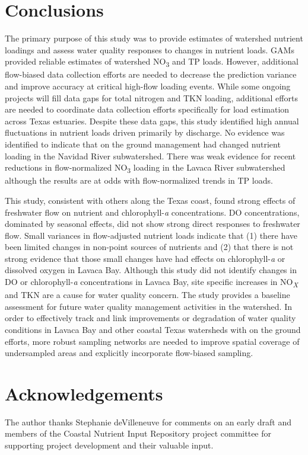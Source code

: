 \documentclass[fleqn,10pt,lineno]{wlpeerj} %
\begin{document}
\hypertarget{conclusions}{%
\section*{Conclusions}\label{conclusions}}

The primary purpose of this study was to provide estimates of watershed
nutrient loadings and assess water quality responses to changes in
nutrient loads. GAMs provided reliable estimates of watershed
NO\textsubscript{3} and TP loads. However, additional flow-biased data
collection efforts are needed to decrease the prediction variance and
improve accuracy at critical high-flow loading events. While some
ongoing projects will fill data gaps for total nitrogen and TKN loading,
additional efforts are needed to coordinate data collection efforts
specifically for load estimation across Texas estuaries. Despite these
data gaps, this study identified high annual fluctuations in nutrient
loads driven primarily by discharge. No evidence was identified to
indicate that on the ground management had changed nutrient loading in
the Navidad River subwatershed. There was weak evidence for recent
reductions in flow-normalized NO\textsubscript{3} loading in the Lavaca
River subwatershed although the results are at odds with flow-normalized
trends in TP loads.

This study, consistent with others along the Texas coast, found strong
effects of freshwater flow on nutrient and chlorophyll-\emph{a}
concentrations. DO concentrations, dominated by seasonal effects, did
not show strong direct responses to freshwater flow. Small variances in
flow-adjusted nutrient loads indicate that (1) there have been limited
changes in non-point sources of nutrients and (2) that there is not
strong evidence that those small changes have had effects on
chlorophyll-\emph{a} or dissolved oxygen in Lavaca Bay. Although this
study did not identify changes in DO or chlorophyll-\emph{a}
concentrations in Lavaca Bay, site specific increases in
NO\textsubscript{\emph{X}} and TKN are a cause for water quality
concern. The study provides a baseline assessment for future water
quality management activities in the watershed. In order to effectively
track and link improvements or degradation of water quality conditions
in Lavaca Bay and other coastal Texas watersheds with on the ground
efforts, more robust sampling networks are needed to improve spatial
coverage of undersampled areas and explicitly incorporate flow-biased
sampling.

\hypertarget{acknowledgements}{%
\section*{Acknowledgements}\label{acknowledgements}}

The author thanks Stephanie deVilleneuve for comments on an early draft
and members of the Coastal Nutrient Input Repository project committee
for supporting project development and their valuable input.

\printbibliography
\end{document}
